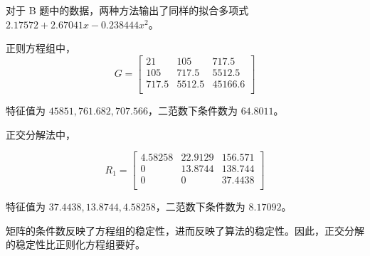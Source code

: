 \documentclass{ctexart}
\begin{document}
对于 B 题中的数据，两种方法输出了同样的拟合多项式 $2.17572 +2.67041x -0.238444x^2$。

正则方程组中，
\begin{equation}
G=
\begin{bmatrix}
21 & 105 & 717.5 \\
105 & 717.5 & 5512.5 \\
717.5 & 5512.5 & 45166.6 \\
\end{bmatrix}
\end{equation}

特征值为 $45851,761.682,707.566$，二范数下条件数为 $64.8011$。

正交分解法中，

\begin{equation}
R_1=
\begin{bmatrix}
4.58258 & 22.9129 & 156.571 \\
0 & 13.8744 & 138.744 \\
0 & 0 & 37.4438 \\
\end{bmatrix}
\end{equation}

特征值为 $37.4438,13.8744,4.58258$，二范数下条件数为 $8.17092$。

矩阵的条件数反映了方程组的稳定性，进而反映了算法的稳定性。因此，正交分解的稳定性比正则化方程组要好。
\end{document}
